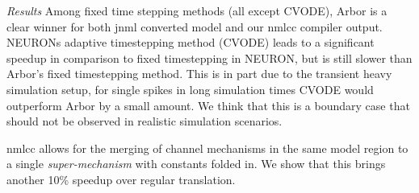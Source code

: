 \documentclass{beamer}
\begin{document}
\begin{frame}[t, fragile]
\begin{columns}
\begin{column}{0.42\textwidth}
        \emph{Results}
        Among fixed time stepping methods (all except CVODE),
            Arbor is a clear winner for both jnml converted model
            and our nmlcc compiler output.
        NEURONs adaptive timestepping method (CVODE)
            leads to a significant speedup in comparison
            to fixed timestepping in NEURON,
            but is still slower than Arbor's 
            fixed timestepping method.
        This is in part due to the transient heavy simulation setup,
            for single spikes in long simulation times CVODE
            would outperform Arbor by a small amount.
        We think that this is a boundary case that should not be observed
            in realistic simulation scenarios.

        nmlcc allows for the merging of channel mechanisms in the same
        model region to a single \emph{super-mechanism} with constants
        folded in.
        We show that this brings another 10\% speedup over
        regular translation.


\end{column}
\end{columns}
\end{frame}
\end{document}
